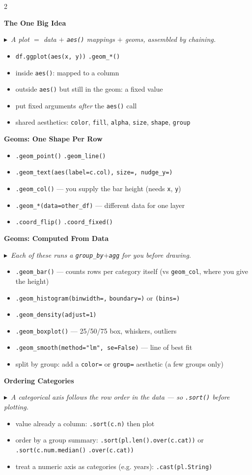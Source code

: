 \documentclass[11pt, a4paper]{article}
\newcommand{\code}[1]{\textcolor{codecolor}{\texttt{#1}}}
\newcommand{\head}[1]{\smallskip\textbf{#1}\par\smallskip}
\newcommand{\key}[1]{\textcolor{keycolor}{$\blacktriangleright$~\textit{#1}}\par\smallskip}
\begin{document}
\begin{multicols}{2}

\head{The One Big Idea}
\key{A plot $=$ data $+$ \code{aes()} mappings $+$ geoms, assembled by chaining.}
\begin{itemize}
  \item \code{df.ggplot(aes(x, y))} \code{.geom\_*()}
  \item inside \code{aes()}: mapped to a column
  \item outside \code{aes()} but still in the geom: a fixed value
  \item put fixed arguments \emph{after} the \code{aes()} call
  \item shared aesthetics: \code{color}, \code{fill}, \code{alpha}, \code{size}, \code{shape}, \code{group}
\end{itemize}

\head{Geoms: One Shape Per Row}
\begin{itemize}
  \item \code{.geom\_point()} \code{.geom\_line()}
  \item \code{.geom\_text(aes(label=c.col),} \code{size=, nudge\_y=)}
  \item \code{.geom\_col()} --- you supply the bar height (needs \code{x}, \code{y})
  \item \code{.geom\_*(data=other\_df)} --- different data for one layer
  \item \code{.coord\_flip()} \code{.coord\_fixed()}
\end{itemize}

\head{Geoms: Computed From Data}
\key{Each of these runs a \code{group\_by}$+$\code{agg} for you before drawing.}
\begin{itemize}
  \item \code{.geom\_bar()} --- counts rows per category itself (vs \code{geom\_col}, where you give the height)
  \item \code{.geom\_histogram(binwidth=,} \code{boundary=)} or \code{(bins=)}
  \item \code{.geom\_density(adjust=1)}
  \item \code{.geom\_boxplot()} --- 25/50/75 box, whiskers, outliers
  \item \code{.geom\_smooth(method="lm", se=False)} --- line of best fit
  \item split by group: add a \code{color=} or \code{group=} aesthetic (a few groups only)
\end{itemize}

\head{Ordering Categories}
\key{A categorical axis follows the row order in the data --- so \code{.sort()} before plotting.}
\begin{itemize}
  \item value already a column: \code{.sort(c.n)} then plot
  \item order by a group summary: \code{.sort(pl.len().over(c.cat))} or \code{.sort(c.num.median()} \code{.over(c.cat))}
  \item treat a numeric axis as categories (e.g. years): \code{.cast(pl.String)}
\end{itemize}


\end{multicols}
\end{document}

